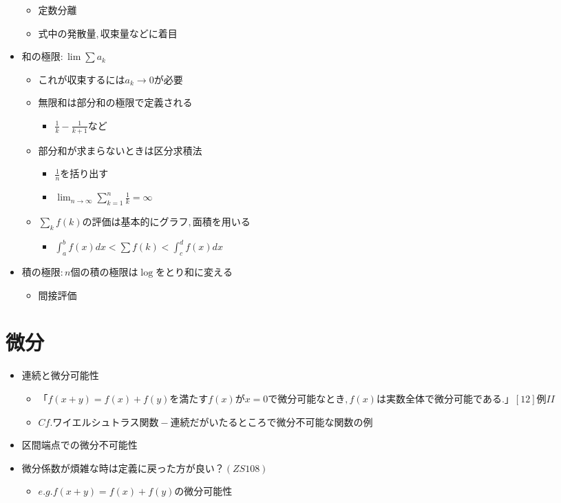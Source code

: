 \documentclass[dvipdfmx,uplatex]{jsarticle}
\begin{document}
\begin{itemize}
\begin{itemize}
\begin{itemize}
\begin{itemize}
			\end{itemize}
		\end{itemize}
		\item $ 定数分離$
		\item $ 式中の発散量,収束量などに着目$
	\end{itemize}
	\item $ 和の極限: \lim \sum a_k$
	\begin{itemize}
		\item $ これが収束するには a_k \to 0 が必要$
		\item $ 無限和は部分和の極限で定義される$
		\begin{itemize}
			\item $ \frac{1}{k} - \frac{1}{k+1} など$
		\end{itemize}
		\item $ 部分和が求まらないときは区分求積法$
		\begin{itemize}
			\item $ \frac{1}{n}を括り出す$
			\item $ \lim_{n \to \infty} \sum^n_{k = 1} \frac{1}{k} = \infty$
		\end{itemize}
		\item $ \sum_k f(k) の評価は基本的にグラフ,面積を用いる$
		\begin{itemize}
			\item $ \int^b_a f(x)dx < \sum f(k) < \int^d_c f(x)dx$
		\end{itemize}
	\end{itemize}
	\item $ 積の極限: n個の積の極限は \log をとり和に変える$
	\begin{itemize}
		\item $ 間接評価$
	\end{itemize}
\end{itemize}

\section{微分}
\begin{itemize}
	\item $ 連続と微分可能性$
	\begin{itemize}
		\item $ 「f(x + y) = f(x) + f(y)を満たす f(x) が x = 0 で微分可能なとき, f(x) は実数全体で微分可能である.」[12]例II$
		\item $ Cf. ワイエルシュトラス関数 - 連続だがいたるところで微分不可能な関数の例$
	\end{itemize}
	\item $ 区間端点での微分不可能性$
	\item $ 微分係数が煩雑な時は定義に戻った方が良い？(ZS108)$
	\begin{itemize}
		\item $ e.g. f(x+y) = f(x) + f(y) の微分可能性$
	\end{itemize}
\end{itemize}
\end{document}

